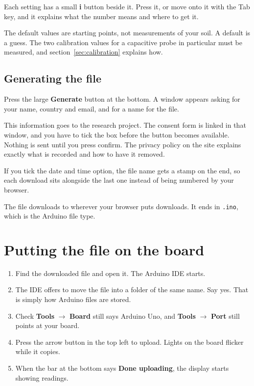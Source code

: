 \documentclass[11pt,a4paper]{article}
\newenvironment{caution}
  {\par\medskip\noindent
   \begin{lrbox}{\nfbox}\begin{minipage}{0.94\linewidth}\vspace{2pt}}
  {\vspace{2pt}\end{minipage}\end{lrbox}%
   \fcolorbox{warn}{white}{\usebox{\nfbox}}\par\medskip}
\begin{document}
Each setting has a small \textbf{i} button beside it. Press it, or move onto it
with the Tab key, and it explains what the number means and where to get it.

\begin{caution}
The default values are starting points, not measurements of your soil. A
default is a guess. The two calibration values for a capacitive probe in
particular must be measured, and section~\ref{sec:calibration} explains how.
\end{caution}

\subsection{Generating the file}

Press the large \textbf{Generate} button at the bottom. A window appears asking
for your name, country and email, and for a name for the file.

This information goes to the research project. The consent form is linked in
that window, and you have to tick the box before the button becomes available.
Nothing is sent until you press confirm. The privacy policy on the site
explains exactly what is recorded and how to have it removed.

If you tick the date and time option, the file name gets a stamp on the end, so
each download sits alongside the last one instead of being numbered by your
browser.

The file downloads to wherever your browser puts downloads. It ends in
\texttt{.ino}, which is the Arduino file type.

\section{Putting the file on the board}

\begin{enumerate}
  \item Find the downloaded file and open it. The Arduino IDE starts.
  \item The IDE offers to move the file into a folder of the same name. Say
        yes. That is simply how Arduino files are stored.
  \item Check \textbf{Tools} $\rightarrow$ \textbf{Board} still says Arduino
        Uno, and \textbf{Tools} $\rightarrow$ \textbf{Port} still points at
        your board.
  \item Press the arrow button in the top left to upload. Lights on the board
        flicker while it copies.
  \item When the bar at the bottom says \textbf{Done uploading}, the display
        starts showing readings.
\end{enumerate}
\end{document}
